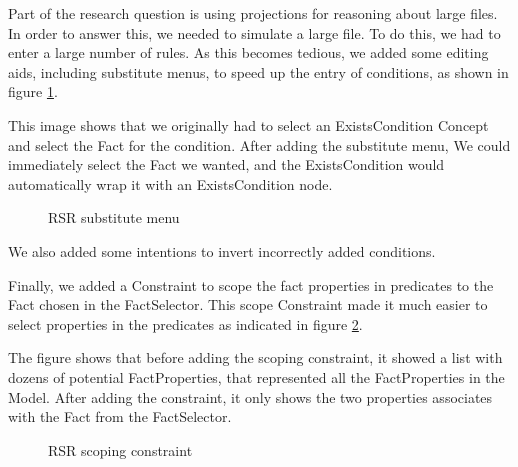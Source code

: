 Part of the research question is using projections for reasoning about large files.
In order to answer this, we needed to simulate a large file.
To do this, we had to enter a large number of rules.
As this becomes tedious, we added some editing aids, including substitute menus, to speed up the entry of conditions, as shown in figure \ref{fig:RSRSubstituteMenu}.

This image shows that we originally had to select an ExistsCondition Concept and select the Fact for the condition.
After adding the substitute menu, We could immediately select the Fact we wanted, and the ExistsCondition would automatically wrap it with an ExistsCondition node.

\begin{figure}[h]
    \centering
    \caption{RSR substitute menu}
    \label{fig:RSRSubstituteMenu}
\end{figure}

We also added some intentions to invert incorrectly added conditions.

Finally, we added a Constraint to scope the fact properties in predicates to the Fact chosen in the FactSelector.
This scope Constraint made it much easier to select properties in the predicates as indicated in figure \ref{fig:RSRConstraint}.

The figure shows that before adding the scoping constraint, it showed a list with dozens of potential FactProperties, that represented all the FactProperties in the Model.
After adding the constraint, it only shows the two properties associates with the Fact from the FactSelector.

\begin{figure}[h]
    \centering
    \caption{RSR scoping constraint}
    \label{fig:RSRConstraint}
\end{figure}


